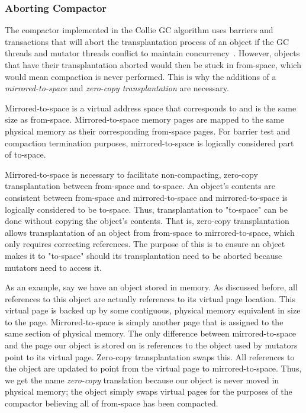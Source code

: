 \documentclass{sig-alternate}
\begin{document}
\subsubsection{Aborting Compactor}
\label{sec:collieAbortion}

The compactor implemented in the Collie GC algorithm uses barriers 
and transactions that will abort the transplantation process of an object if the
GC threads and mutator threads conflict to maintain concurrency~\cite{Iyengar:Collie}.
However, objects that have their transplantation aborted would then be stuck
in from-space, which would mean compaction is never performed. This is why
the additions of a \emph{mirrored-to-space} and \emph{zero-copy transplantation} are necessary.

Mirrored-to-space is a virtual address space that corresponds to and is the same
size as from-space. Mirrored-to-space memory pages are mapped to the same physical
memory as their corresponding from-space pages. For barrier test and compaction 
termination purposes, mirrored-to-space is logically considered part of to-space.

Mirrored-to-space is necessary to facilitate non-compacting, zero-copy transplantation 
between from-space and to-space. An object's contents are 
consistent between from-space and mirrored-to-space and mirrored-to-space
is logically considered to be to-space. Thus, transplantation to "to-space"
can be done without copying the object's contents. That is, zero-copy transplantation
allows transplantation of an object from from-space to mirrored-to-space, which only
requires correcting references. The purpose of this is to ensure
an object makes it to "to-space" should its transplantation need 
to be aborted because mutators need to access it.

As an example, say we have an object stored in memory. As discussed before, all references
to this object are actually references to its virtual page location. This virtual page
is backed up by some contiguous, physical memory equivalent in size to the page. 
Mirrored-to-space is simply another page that is assigned to the same section of physical memory. 
The only difference between mirrored-to-space and the page our object is stored on
is references to the object used by mutators point to its virtual page.
Zero-copy transplantation swaps this. All references to the object are
updated to point from the virtual page to mirrored-to-space. 
Thus, we get the name \emph{zero-copy} translation
because our object is never moved in physical memory; the object simply
swaps virtual pages for the purposes of the compactor believing all of from-space
has been compacted.
\end{document}
